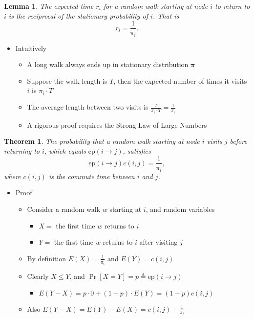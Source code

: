\documentclass{article}
\newtheorem*{mythm*}{Theorem}
\newtheorem*{mylem*}{Lemma}
\begin{document}
\begin{mylem*}
The expected time $r_i$ for a random walk starting at node $i$ to return to $i$ is the reciprocal of the stationary probability of $i$.
That is
\[
r_i = \frac{1}{\pi_i}.
\]
\end{mylem*}

\begin{itemize}
\item Intuitively
\begin{itemize}
\item A long walk always ends up in stationary distribution $\bm{\pi}$
\item Suppose the walk length is $T$, then the expected number of times it visits $i$ is $\pi_i \cdot T$
\item The average length between two visits is $\frac{T}{\pi_i \cdot T} = \frac{1}{\pi_i}$
\item A rigorous proof requires the Strong Law of Large Numbers
\end{itemize}
\end{itemize}

\begin{mythm*}
The probability that a random walk starting at node $i$ visits $j$ before returning to $i$, which equals $\mathrm{ep}(i\rightarrow j)$, satisfies
\[
\mathrm{ep}(i\rightarrow j)c(i,j) = \frac{1}{\pi_i},
\]
where $c(i,j)$ is the commute time between $i$ and $j$.
\end{mythm*}

\begin{itemize}
\item Proof
\begin{itemize}
\item Consider a random walk $w$ starting at $i$, and random variables
\begin{itemize}
\item $X = $ the first time $w$ returns to $i$
\item $Y = $ the first time $w$ returns to $i$ after visiting $j$
\end{itemize}
\item By definition $E(X) = \frac{1}{\pi_i}$ and $E(Y) = c(i,j)$
\item Clearly $X \leq Y$, and $\Pr\left[X = Y\right] = p \triangleq \mathrm{ep}(i\rightarrow j)$
\begin{itemize}
\item $E(Y - X) = p\cdot 0 + (1 - p)\cdot E(Y) = (1-p) c(i,j)$
\end{itemize}
\item Also $E(Y - X) = E(Y) - E(X) = c(i,j) - \frac{1}{\pi_i}$
\end{itemize}
\end{itemize}
\end{document}
